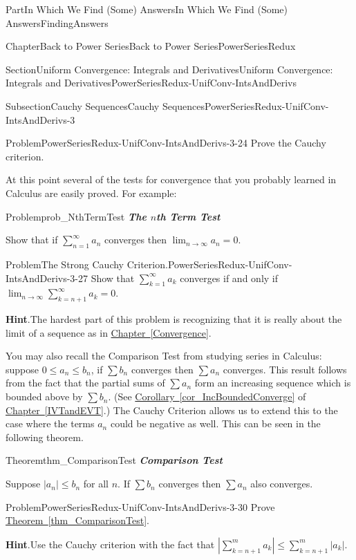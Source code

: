 \documentclass[oneside,10pt,]{book}
\newcommand{\blocktitlefont}{\relax}
\newcommand{\xreffont}{\relax}
\newcommand{\alert}[1]{\textbf{\textit{#1}}}
\numberwithin{equation}{part}
\newcommand{\abs}[1]{\left|#1\right|}
\def\limit#1#2#3{{\displaystyle\lim_{#1\rightarrow #2}#3}}
\begin{document}
\begin{partptx}{Part}{In Which We Find (Some) Answers}{}{In Which We Find (Some) Answers}{}{}{FindingAnswers}
\begin{chapterptx}{Chapter}{Back to Power Series}{}{Back to Power Series}{}{}{PowerSeriesRedux}
\begin{sectionptx}{Section}{Uniform Convergence: Integrals and Derivatives}{}{Uniform Convergence: Integrals and Derivatives}{}{}{PowerSeriesRedux-UnifConv-IntsAndDerivs}
\begin{subsectionptx}{Subsection}{Cauchy Sequences}{}{Cauchy Sequences}{}{}{PowerSeriesRedux-UnifConv-IntsAndDerivs-3}
\begin{problem}{Problem}{}{PowerSeriesRedux-UnifConv-IntsAndDerivs-3-24}
 Prove the Cauchy criterion.%
\end{problem}
At this point several of the tests for convergence that you probably learned in Calculus are easily proved.  For example:%
\begin{problem}{Problem}{}{prob_NthTermTest}%
\alert{The \(n\)th Term Test}%
\par
{} Show that if \(\sum_{n=1}^\infty a_n\) converges then \(\limit{n}{\infty}{a_n}=0\).%
\end{problem}
\begin{problem}{Problem}{The Strong Cauchy Criterion.}{PowerSeriesRedux-UnifConv-IntsAndDerivs-3-27}%
 Show that \(\displaystyle\sum_{k=1}^\infty a_k\) converges if and only if \(\limit{n}{\infty}{\sum_{k=n+1}^\infty a_k}=0\).%
\par\smallskip%
\noindent\textbf{\blocktitlefont Hint}.\hypertarget{PowerSeriesRedux-UnifConv-IntsAndDerivs-3-27-3}{}\quad{}The hardest part of this problem is recognizing that it is really about the limit of a sequence as in \hyperref[Convergence]{Chapter~{\xreffont\ref{Convergence}}}.%
\end{problem}
You may also recall the Comparison Test from studying series in Calculus: suppose \(0\leq a_n\leq b_n\), if \(\sum
b_n\) converges then \(\sum a_n\) converges.  This result follows from the fact that the partial sums of \(\sum a_n\) form an increasing sequence which is bounded above by \(\sum
b_n\).  (See \hyperref[cor_IncBoundedConverge]{Corollary~{\xreffont\ref{cor_IncBoundedConverge}}} of \hyperref[IVTandEVT]{Chapter~{\xreffont\ref{IVTandEVT}}}.)  The Cauchy Criterion allows us to extend this to the case where the terms \(a_n\) could be negative as well.  This can be seen in the following theorem.%
\begin{theorem}{Theorem}{}{}{thm_ComparisonTest}%
\alert{Comparison Test}%
\par
{} Suppose \(|a_n|\leq b_n\) for all \(n\).  If \(\sum
b_n\) converges then \(\sum a_n\) also converges.%
\end{theorem}
\begin{problem}{Problem}{}{PowerSeriesRedux-UnifConv-IntsAndDerivs-3-30}%
Prove \hyperref[thm_ComparisonTest]{Theorem~{\xreffont\ref{thm_ComparisonTest}}}.%
\par\smallskip%
\noindent\textbf{\blocktitlefont Hint}.\hypertarget{PowerSeriesRedux-UnifConv-IntsAndDerivs-3-30-4}{}\quad{}Use the Cauchy criterion with the fact that \(\abs{\sum_{k=n+1}^ma_k}\leq\sum_{k=n+1}^m\abs{a_k}\).%

\end{problem}
\end{subsectionptx}
\end{sectionptx}
\end{chapterptx}
\end{partptx}
\end{document}
